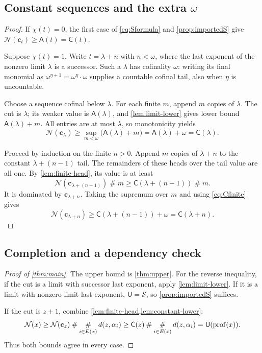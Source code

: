 \documentclass[11pt,a4paper]{article}
\newtheorem{lemma}[theorem]{Lemma}
\theoremstyle{definition}
\newcommand{\ns}{\mathbin{\#}}
\newcommand{\bigns}{\mathop{\#}\displaylimits}
\newcommand{\OpN}{\mathcal N}
\newcommand{\OpS}{\mathcal S}
\newcommand{\FunA}{\mathsf A}
\newcommand{\FunC}{\mathsf C}
\newcommand{\FunU}{\mathsf U}
\newcommand{\dd}[2]{d(#1,#2)}
\newcommand{\prof}{\operatorname{prof}}
\newcommand{\cseq}[1]{\mathbf c_{#1}}
\begin{document}
\subsection{Constant sequences and the extra \texorpdfstring{$\omega$}{omega}}
\begin{proof}
If $\chi(t)=0$, the first case of \eqref{eq:Sformula} and
\cref{prop:importedS} give
$\OpN(\cseq{t})\ge\FunA(t)=\FunC(t)$.

Suppose $\chi(t)=1$. Write $t=\lambda+n$ with $n<\omega$, where the last
exponent of the nonzero limit $\lambda$ is a successor. Such a $\lambda$
has cofinality $\omega$: writing its final monomial as
$\omega^{\eta+1}=\omega^\eta\cdot\omega$ supplies a countable cofinal tail,
also when $\eta$ is uncountable.

Choose a sequence cofinal below $\lambda$. For each finite $m$, append
$m$ copies of $\lambda$. The cut is $\lambda$; its weaker value is
$\FunA(\lambda)$, and \cref{lem:limit-lower} gives lower bound
$\FunA(\lambda)+m$. All entries are at most $\lambda$, so monotonicity yields
\[
 \OpN(\cseq{\lambda})\ge
 \sup_{m<\omega}\bigl(\FunA(\lambda)+m\bigr)
 =\FunA(\lambda)+\omega=\FunC(\lambda).
\]

Proceed by induction on the finite $n>0$. Append $m$ copies of
$\lambda+n$ to the constant $\lambda+(n-1)$ tail. The remainders of these
heads over the tail value are all one. By \cref{lem:finite-head}, its value
is at least
\[
 \OpN(\cseq{\lambda+(n-1)})\ns m
 \ge\FunC(\lambda+(n-1))\ns m.
\]
It is dominated by $\cseq{\lambda+n}$. Taking the supremum over $m$ and
using \eqref{eq:Cfinite} gives
\[
 \OpN(\cseq{\lambda+n})\ge
 \FunC(\lambda+(n-1))+\omega=\FunC(\lambda+n).
\]
\end{proof}

\subsection{Completion and a dependency check}
\begin{proof}[Proof of \cref{thm:main}]
The upper bound is \cref{thm:upper}. For the reverse inequality, if the cut
is a limit with successor last exponent, apply \cref{lem:limit-lower}.
If it is a limit with nonzero limit last exponent, $\FunU=\OpS$, so
\cref{prop:importedS} suffices.

If the cut is $z+1$, combine \cref{lem:finite-head,lem:constant-lower}:
\[
 \OpN(x)\ge\OpN(\cseq{z})\ns\bigns_{i\in E(x)}\dd{z}{\alpha_i}
 \ge\FunC(z)\ns\bigns_{i\in E(x)}\dd{z}{\alpha_i}
 =\FunU(\prof(x)).
\]
Thus both bounds agree in every case.
\end{proof}
\end{document}
